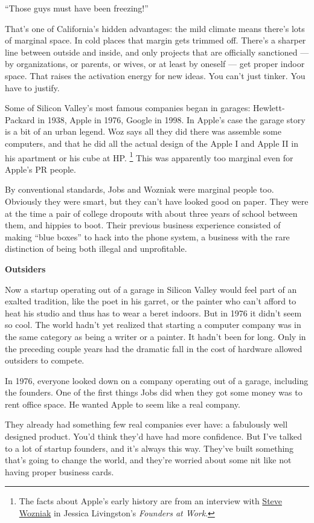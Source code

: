 \documentclass[12pt]{book}
\begin{document}
``Those guys must have been freezing!''

That's one of California's hidden advantages: the mild climate means
there's lots of marginal space. In cold places that margin gets trimmed
off. There's a sharper line between outside and inside, and only
projects that are officially sanctioned --- by organizations, or
parents, or wives, or at least by oneself --- get proper indoor space.
That raises the activation energy for new ideas. You can't just tinker.
You have to justify.

Some of Silicon Valley's most famous companies began in garages:
Hewlett-Packard in 1938, Apple in 1976, Google in 1998. In Apple's case
the garage story is a bit of an urban legend. Woz says all they did
there was assemble some computers, and that he did all the actual design
of the Apple I and Apple II in his apartment or his cube at HP.
\footnote{The facts about Apple's early history are from an interview with
\href{http://foundersatwork.com/steve-wozniak.html}{Steve Wozniak} in
Jessica Livingston's \emph{Founders at Work}.} This was apparently too marginal even for
Apple's PR people.

By conventional standards, Jobs and Wozniak were marginal people too.
Obviously they were smart, but they can't have looked good on paper.
They were at the time a pair of college dropouts with about three years
of school between them, and hippies to boot. Their previous business
experience consisted of making ``blue boxes'' to hack into the phone
system, a business with the rare distinction of being both illegal and
unprofitable.

\textbf{Outsiders}

Now a startup operating out of a garage in Silicon Valley would feel
part of an exalted tradition, like the poet in his garret, or the
painter who can't afford to heat his studio and thus has to wear a beret
indoors. But in 1976 it didn't seem so cool. The world hadn't yet
realized that starting a computer company was in the same category as
being a writer or a painter. It hadn't been for long. Only in the
preceding couple years had the dramatic fall in the cost of hardware
allowed outsiders to compete.

In 1976, everyone looked down on a company operating out of a garage,
including the founders. One of the first things Jobs did when they got
some money was to rent office space. He wanted Apple to seem like a real
company.

They already had something few real companies ever have: a fabulously
well designed product. You'd think they'd have had more confidence. But
I've talked to a lot of startup founders, and it's always this way.
They've built something that's going to change the world, and they're
worried about some nit like not having proper business cards.
\end{document}
